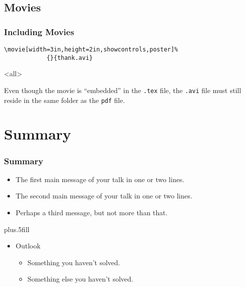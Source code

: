 \documentclass{article}
\begin{document}



\subsection{Movies}

\begin{frame}[fragile]
  \frametitle{Including Movies}
\begin{verbatim}
\movie[width=3in,height=2in,showcontrols,poster]%
            {}{thank.avi}
\end{verbatim}

\mode
<all>
\medskip


Even though the movie is ``embedded'' in the \texttt{.tex} file, the \texttt{.avi} file must still reside in the same folder as the \texttt{pdf}  file.
\end{frame}


\section*{Summary}

\begin{frame}
  \frametitle<presentation>{Summary}

  \begin{itemize}
  \item
    The \alert{first main message} of your talk in one or two lines.\pause
  \item
    The \alert{second main message} of your talk in one or two lines.\pause
  \item
    Perhaps a \alert{third message}, but not more than that.\pause
  \end{itemize}
  
  \vskip0pt plus.5fill
  \begin{itemize}
  \item
    Outlook
    \begin{itemize}
    \item
      Something you haven't solved.
    \item
      Something else you haven't solved.
    \end{itemize}
  \end{itemize}
\end{frame}
\end{document}
